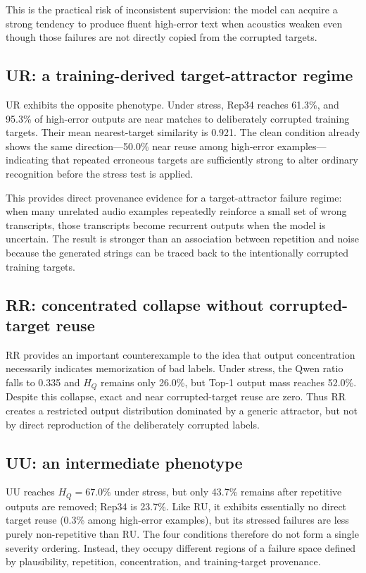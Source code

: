 \documentclass[conference]{IEEEtran}
\begin{document}
This is the practical risk of inconsistent supervision: the model can acquire a
strong tendency to produce fluent high-error text when acoustics weaken even
though those failures are not directly copied from the corrupted targets.

\subsection{UR: a training-derived target-attractor regime}
UR exhibits the opposite phenotype. Under stress, Rep34 reaches 61.3\%, and
95.3\% of high-error outputs are near matches to deliberately corrupted training
targets. Their mean nearest-target similarity is 0.921. The clean condition
already shows the same direction---50.0\% near reuse among high-error examples---
indicating that repeated erroneous targets are sufficiently strong to alter
ordinary recognition before the stress test is applied.

This provides direct provenance evidence for a target-attractor failure regime:
when many unrelated audio examples repeatedly reinforce a small set of wrong
transcripts, those transcripts become recurrent outputs when the model is
uncertain. The result is stronger than an association between repetition and
noise because the generated strings can be traced back to the intentionally
corrupted training targets.

\subsection{RR: concentrated collapse without corrupted-target reuse}
RR provides an important counterexample to the idea that output concentration
necessarily indicates memorization of bad labels. Under stress, the Qwen ratio
falls to 0.335 and $H_Q$ remains only 26.0\%, but Top-1 output mass reaches
52.0\%. Despite this collapse, exact and near corrupted-target reuse are zero.
Thus RR creates a restricted output distribution dominated by a generic
attractor, but not by direct reproduction of the deliberately corrupted labels.

\subsection{UU: an intermediate phenotype}
UU reaches $H_Q=67.0\%$ under stress, but only 43.7\% remains after repetitive
outputs are removed; Rep34 is 23.7\%. Like RU, it exhibits essentially no direct
target reuse (0.3\% among high-error examples), but its stressed failures are
less purely non-repetitive than RU. The four conditions therefore do not form a
single severity ordering. Instead, they occupy different regions of a failure
space defined by plausibility, repetition, concentration, and training-target
provenance.
\end{document}
